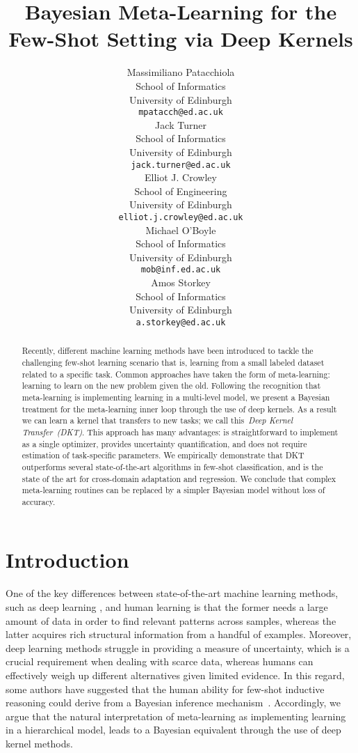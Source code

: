 \documentclass{article}
\title{Bayesian Meta-Learning for the Few-Shot Setting via Deep Kernels}
\author{Massimiliano Patacchiola\\
  School of Informatics\\
  University of Edinburgh\\
  \texttt{mpatacch@ed.ac.uk} \\
  \And
  Jack Turner\\
  School of Informatics\\
  University of Edinburgh\\
  \texttt{jack.turner@ed.ac.uk} \\
  \And
  Elliot J. Crowley\\
  School of Engineering\\
  University of Edinburgh\\
  \texttt{elliot.j.crowley@ed.ac.uk} \\
  \And
  Michael O'Boyle\\
  School of Informatics\\
  University of Edinburgh\\
  \texttt{mob@inf.ed.ac.uk} \\
  \And
  Amos Storkey\\
  School of Informatics\\
  University of Edinburgh\\
  \texttt{a.storkey@ed.ac.uk} \\
}
\begin{document}
\maketitle

\begin{abstract}
    Recently, different machine learning methods have been introduced to tackle the challenging few-shot learning scenario that is, learning from a small labeled dataset related to a specific task. Common approaches have taken the form of meta-learning: learning to learn on the new problem given the old. Following the recognition that meta-learning is implementing learning in a multi-level model, we present a Bayesian treatment for the meta-learning inner loop through the use of deep kernels. As a result we can learn a kernel that transfers to new tasks; we call this~\emph{Deep Kernel Transfer~(DKT)}. This approach has many advantages: is straightforward to implement as a single optimizer, provides uncertainty quantification, and does not require estimation of task-specific parameters. We empirically demonstrate that DKT outperforms several state-of-the-art algorithms in few-shot classification, and is the state of the art for cross-domain adaptation and regression. We conclude that complex meta-learning routines can be replaced by a simpler Bayesian model without loss of accuracy.
\end{abstract}

\section{Introduction}
One of the key differences between state-of-the-art machine learning methods, such as deep learning \citep{lecun2015deep, schmidhuber2015deep}, and human learning is that the former needs a large amount of data in order to find relevant patterns across samples, whereas the latter acquires rich structural information from a handful of examples. Moreover, deep learning methods struggle in providing a measure of uncertainty, which is a crucial requirement when dealing with scarce data, whereas humans can effectively weigh up different alternatives given limited evidence. In this regard, some authors have suggested that the human ability for few-shot inductive reasoning could derive from a Bayesian inference mechanism~\citep{steyvers2006probabilistic, tenenbaum2011grow}. Accordingly, we argue that the natural interpretation of meta-learning as implementing learning in a hierarchical model, leads to a Bayesian equivalent through the use of deep kernel methods.
\end{document}
